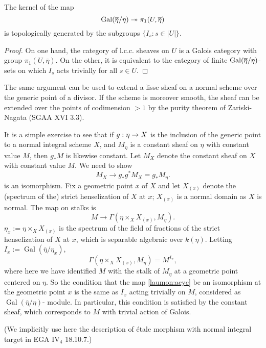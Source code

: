 \documentclass[deligne.tex]{subfiles}
\begin{document}
\begin{corollary*}
	The kernel of the map
	\begin{equation*}
		\operatorname{Gal}(\overline\eta/\eta)\twoheadrightarrow\pi_1(U,\overline\eta)
	\end{equation*}
	is topologically generated by the subgroups $\{I_s:s\in|U|\}$.
\end{corollary*}
\begin{proof}
	On one hand, the category of l.c.c. sheaves on $U$ is a Galois category
	with group $\pi_1(U,\overline\eta)$. On the other, it is equivalent to
	the category of finite $\operatorname{Gal}(\overline\eta/\eta)$-sets on which
	$I_s$ acts trivially for all $s\in U$.
\end{proof}
\begin{remark}
	The same argument can be used to extend a lisse sheaf on a normal scheme
	over the generic point of a divisor. If the scheme is moreover smooth,
	the sheaf can be extended over the points of codimension $>1$ by the
	purity theorem of Zariski-Nagata (SGAA XVI 3.3).
\end{remark}
\begin{remark}
It is a simple exercise to see that if $g:\eta\rightarrow X$ is the inclusion
of the generic point to a normal integral scheme $X$, and $M_\eta$
is a constant sheaf on $\eta$ with constant value $M$, then
$g_*M$ is likewise constant. Let $M_X$ denote the constant 
sheaf on $X$ with constant value $M$. We need to show
\begin{equation*}\label{laumon:acyc}
	M_X\rightarrow g_*g^*M_X=g_*M_\eta\tag{$\dagger$}.
\end{equation*}
is an isomorphism. Fix a geometric point $x$ of $X$ and let $X_{(x)}$ denote the (spectrum of the) strict henselization of $X$ at $x$; $X_{(x)}$ is a normal domain as $X$ is normal. The map on stalks is
\begin{equation*}
	M\rightarrow\Gamma(\eta\times_X X_{(x)},M_\eta).
\end{equation*}
$\eta_x:=\eta\times_X X_{(x)}$ is the spectrum of the field of fractions of 
the strict henselization of $X$ at $x$, which is separable algebraic over
$k(\eta)$.
Letting $I_x:=\operatorname{Gal}(\overline\eta/\eta_x)$,
\begin{equation*}
	\Gamma(\eta\times_X X_{(x)},M_\eta)=M^{I_x},
\end{equation*}
where here we have identified $M$ with the stalk of $M_\eta$ at a geometric 
point centered on $\eta$. So the condition that the map \eqref{laumon:acyc} 
be an isomorphism at the geometric point $x$ is the same as $I_x$ acting 
trivially on $M$, considered as $\operatorname{Gal}(\overline\eta/\eta)$-
module. In particular, this condition is satisfied by the constant sheaf, 
which corresponds to $M$ with trivial action of Galois.

(We implicitly use here the description of étale morphism with normal integral target in EGA $\text{IV}_4$ 18.10.7.)
\end{remark}
\end{document}
